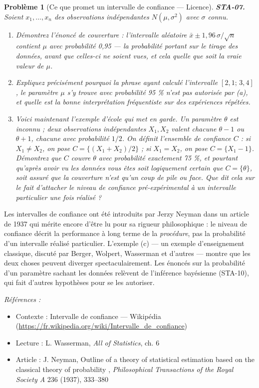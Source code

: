 \documentclass[11pt]{article}
\newtheorem{problem}{Problème}
\newenvironment{refs}{\par\small\noindent\emph{Références :}\begin{itemize}\setlength\itemsep{0pt}}{\end{itemize}\normalsize}
\begin{document}
\begin{problem}[{Ce que promet un intervalle de confiance --- Licence}]
\textbf{STA-07.} Soient $ x_1, \dots, x_n $ des observations indépendantes
$ N(\mu, \sigma^2) $ avec $ \sigma $ connu.
\begin{enumerate}
\item[(a)] Démontrez l'énoncé de couverture : l'intervalle aléatoire
$ \bar{x} \pm 1{,}96\,\sigma/\sqrt{n} $ contient $ \mu $ avec probabilité 0,95 --- la
probabilité portant sur le tirage des données, avant que celles-ci ne soient vues, et cela quelle
que soit la vraie valeur de $ \mu $.
\item[(b)] Expliquez précisément pourquoi la phrase \og{} ayant calculé l'intervalle $ [2{,}1 ;\,3{,}4] $,
le paramètre $ \mu $ s'y trouve avec probabilité 95 \% \fg{} n'est pas autorisée par (a), et quelle
est la bonne interprétation fréquentiste sur des expériences répétées.
\item[(c)] Voici maintenant l'exemple d'école qui met en garde. Un paramètre $ \theta $ est inconnu ;
deux observations indépendantes $ X_1, X_2 $ valent chacune $ \theta - 1 $ ou
$ \theta + 1 $, chacune avec probabilité $ 1/2 $. On définit l'ensemble de confiance
$ C $ : si $ X_1 \ne X_2 $, on pose $ C = \{ (X_1 + X_2)/2 \} $ ; si $ X_1 = X_2 $, on pose
$ C = \{ X_1 - 1 \} $. Démontrez que $ C $ couvre $ \theta $ avec probabilité exactement
75 \%, et pourtant qu'après avoir vu les données vous êtes soit logiquement certain que
$ C = \{\theta\} $, soit assuré que la couverture n'est qu'un coup de pile ou face. Que dit cela
sur le fait d'attacher le niveau de confiance pré-expérimental à un intervalle particulier une fois
réalisé ?
\end{enumerate}

\end{problem}

\noindent Les intervalles de confiance ont été introduits par Jerzy Neyman dans un article
de 1937 qui mérite encore d'être lu pour sa rigueur philosophique : le niveau de confiance décrit
la performance à long terme de la \textit{procédure}, pas la probabilité d'un intervalle réalisé
particulier. L'exemple (c) --- un exemple d'enseignement classique, discuté par Berger, Wolpert,
Wasserman et d'autres --- montre que les deux choses peuvent diverger spectaculairement. Les énoncés
sur la probabilité d'un paramètre sachant les données relèvent de l'inférence bayésienne (STA-10),
qui fait d'autres hypothèses pour se les autoriser.

\begin{refs}
\item Contexte : Intervalle de confiance --- Wikipédia (\url{https://fr.wikipedia.org/wiki/Intervalle_de_confiance})
\item Lecture : L. Wasserman, \textit{All of Statistics}, ch. 6
\item Article : J. Neyman, \og{} Outline of a theory of statistical estimation based on the classical theory of probability \fg{}, \textit{Philosophical Transactions of the Royal Society A} 236 (1937), 333--380
\end{refs}
\end{document}
